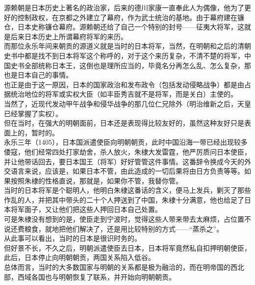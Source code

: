 \begin{multicols}{\theparacolNo}
源赖朝是日本历史上著名的政治家，后来的德川家康一直奉此人为偶像，他为了更好的控制政权，在京都之外建立了幕府，作为武士统治的基地。由于幕府建在镰仓，日本史称镰仓幕府。源赖朝还给了自己一个特别的封号——征夷大将军，这就是后来日本历史上所谓幕府将军的来历。\\

而那位永乐年间来朝贡的源道义就是当时的日本将军，当然，在明朝和之后的清朝史书中都是找不到日本将军这个称呼的，对于这个来历复杂，不清不楚的将军，中国史书全部统称日本王，这倒也是理所应当的，毕竟名分再怎么乱、怎么复杂，那也是日本自己的事情。\\

也正是由于这一原因，日本的国家政治和发布政令（包括发动侵略战争）都是由占据统治地位的将军或实权大臣（如丰臣秀吉就不是将军，而是关白）主使的。\\

当然了，近现代发动甲午战争和侵华战争的那几位仁兄除外（明治维新之后，天皇已经掌握了实权）。\\

但在当时，在强大的明朝面前，日本还是表现得比较友好的，虽然这种友好只是表面上的，暂时的。\\

永乐三年（1405），日本国派遣使臣向明朝朝贡，此时中国沿海一带已经出现较多倭寇，他们经常四处打家劫舍，杀人放火，朱棣大发雷霆，他严厉质问日本使臣，并让他带话回去，要日本国王（将军）好好管管这件事情。这番辞令换成今天的外交语言来说，应该是，如果日本不管，由此造成的一切后果将由日方负责等等。如果按照朱棣的性格直说，那就是，如果你不管，我替你管。\\

当时的日本将军是个聪明人，他明白朱棣这番话的含义，便马上发兵，剿灭了那些作乱的人，并把其中带头的二十个人押送到了中国，朱棣十分满意，他也给足了日本将军面子，又让他们把这些人押回日本自己处置。\\

可是朱棣没有想到的是，使臣走到宁波时，觉得这些人带来带去太麻烦，占位置不说还费粮食，就地把他们解决了，还是用比较特别的方式——“蒸杀之”。\\

从此事可以看出，当时的日本是很识时务的。\\

但好景不长，不久之后，明朝派遣使臣去日本，日本将军竟然私自扣押明朝使臣，此后，日本停止向明朝朝贡，两国关系陷入低谷。\\

总体而言，当时的大多数国家与明朝的关系都是极为融洽的，而在明帝国的西北部，西域各国也与明朝恢复了联系，并开始向明朝朝贡。\\


\end{multicols}

